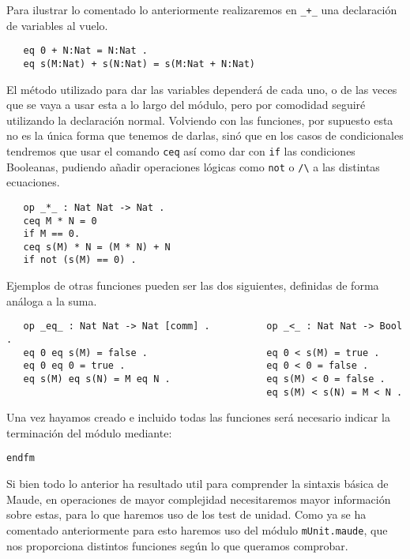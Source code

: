 Para ilustrar lo comentado lo anteriormente realizaremos en \verb"_+_" una declaración de variables al vuelo. \par
{\codesize
\begin{verbatim}
   eq 0 + N:Nat = N:Nat .
   eq s(M:Nat) + s(N:Nat) = s(M:Nat + N:Nat) 
\end{verbatim}
}
 
El método utilizado para dar las variables dependerá de cada uno, o de las veces que se vaya a usar esta a lo largo del módulo, pero por comodidad seguiré utilizando la declaración normal. Volviendo con las funciones, por supuesto esta no es la única forma que tenemos de darlas, sinó que en los casos de condicionales tendremos que usar el comando \texttt{ceq} así como dar con \texttt{if} las condiciones Booleanas, pudiendo añadir operaciones lógicas como \texttt{not} o \verb"/\" a las distintas ecuaciones.\par
{\codesize
\begin{verbatim}
   op _*_ : Nat Nat -> Nat .
   ceq M * N = 0 
   if M == 0.
   ceq s(M) * N = (M * N) + N
   if not (s(M) == 0) .
\end{verbatim}
}

Ejemplos de otras funciones pueden ser las dos siguientes, definidas de forma análoga a la suma.\par

{\codesize
\begin{verbatim}
   op _eq_ : Nat Nat -> Nat [comm] .          op _<_ : Nat Nat -> Bool .
   eq 0 eq s(M) = false .                     eq 0 < s(M) = true .
   eq 0 eq 0 = true .                         eq 0 < 0 = false .
   eq s(M) eq s(N) = M eq N .                 eq s(M) < 0 = false .
                                              eq s(M) < s(N) = M < N .	

\end{verbatim}
}

Una vez hayamos creado e incluido todas las funciones será necesario indicar la terminación del módulo mediante: \par

{\codesize
\begin{verbatim}
endfm
\end{verbatim}
}

Si bien todo lo anterior ha resultado util para comprender la sintaxis básica de Maude, en operaciones de mayor complejidad necesitaremos mayor información sobre estas, para lo que haremos uso de los test de unidad. Como ya se ha comentado anteriormente para esto haremos uso del módulo \texttt{mUnit.maude}, que nos proporciona distintos funciones según lo que queramos comprobar.\par

